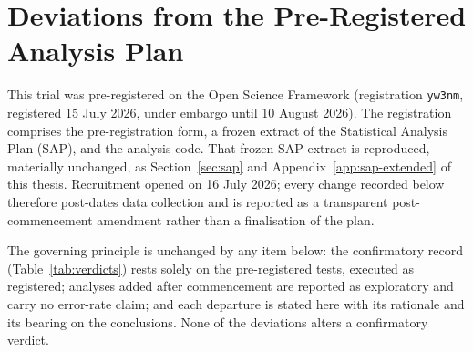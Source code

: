 %
%

\section{Deviations from the Pre-Registered Analysis Plan}
\label{app:deviations}

This trial was pre-registered on the Open Science Framework (registration
\texttt{yw3nm}, registered 15 July 2026, under embargo until 10 August 2026).
The registration comprises the pre-registration form, a frozen extract of the
Statistical Analysis Plan (SAP), and the analysis code. That frozen SAP extract
is reproduced, materially unchanged, as Section~\ref{sec:sap} and
Appendix~\ref{app:sap-extended} of this thesis. Recruitment opened on 16 July
2026; every change recorded below therefore post-dates data collection and is
reported as a transparent post-commencement amendment rather than a
finalisation of the plan.

The governing principle is unchanged by any item below: the confirmatory record
(Table~\ref{tab:verdicts}) rests solely on the pre-registered tests, executed as
registered; analyses added after commencement are reported as exploratory and
carry no error-rate claim; and each departure is stated here with its rationale
and its bearing on the conclusions. None of the deviations alters a confirmatory
verdict.

